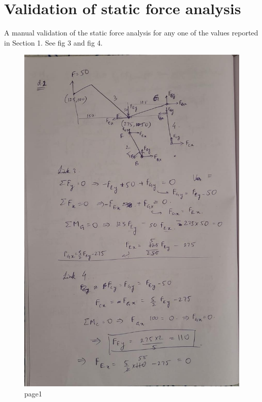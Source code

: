 \section{Validation of static force analysis} 
    A manual validation of the static force analysis for any one of the values reported in Section 1. See fig 3 and fig 4.
    \begin{figure}[hbt!]
        \centering
        \includegraphics[width=0.9\columnwidth]{Images/proof1.jpeg}
        \caption{page1}
        \label{fig:page1}
    \end{figure}
